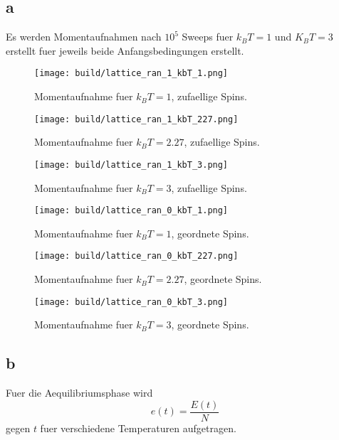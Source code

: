 \documentclass{scrartcl}
\begin{document}
\subsection*{a}%
\label{sub:a}
Es werden Momentaufnahmen nach $10^5$ Sweeps fuer $k_B T = 1$ und $K_B T = 3$ erstellt fuer jeweils beide Anfangsbedingungen erstellt.
\begin{figure}[ht]
  \centering
  \texttt{[image: build/lattice\_ran\_1\_kbT\_1.png]}
  \caption{Momentaufnahme fuer $k_B T = 1$, zufaellige Spins.}%
\end{figure}
\begin{figure}[ht]
  \centering
  \texttt{[image: build/lattice\_ran\_1\_kbT\_227.png]}
  \caption{Momentaufnahme fuer $k_B T = 2.27$, zufaellige Spins.}%
\end{figure}
\begin{figure}[ht]
  \centering
  \texttt{[image: build/lattice\_ran\_1\_kbT\_3.png]}
  \caption{Momentaufnahme fuer $k_B T = 3$, zufaellige Spins.}%
\end{figure}
\begin{figure}[ht]
  \centering
  \texttt{[image: build/lattice\_ran\_0\_kbT\_1.png]}
  \caption{Momentaufnahme fuer $k_B T = 1$, geordnete Spins.}%
\end{figure}
\begin{figure}[ht]
  \centering
  \texttt{[image: build/lattice\_ran\_0\_kbT\_227.png]}
  \caption{Momentaufnahme fuer $k_B T = 2.27$, geordnete Spins.}%
\end{figure}
\begin{figure}[ht]
  \centering
  \texttt{[image: build/lattice\_ran\_0\_kbT\_3.png]}
  \caption{Momentaufnahme fuer $k_B T = 3$, geordnete Spins.}%
\end{figure}

\subsection*{b}
Fuer die Aequilibriumsphase wird
\begin{equation}
  e(t) = \frac{E(t)}{N}
\end{equation}
gegen $t$ fuer verschiedene Temperaturen aufgetragen.
\end{document}
